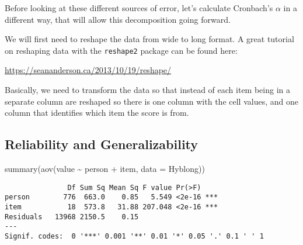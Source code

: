 \documentclass[
]{book}
\newenvironment{Shaded}{\begin{snugshade}}{\end{snugshade}}
\newcommand{\AttributeTok}[1]{\textcolor[rgb]{0.77,0.63,0.00}{#1}}
\newcommand{\CommentTok}[1]{\textcolor[rgb]{0.56,0.35,0.01}{\textit{#1}}}
\newcommand{\DecValTok}[1]{\textcolor[rgb]{0.00,0.00,0.81}{#1}}
\newcommand{\FunctionTok}[1]{\textcolor[rgb]{0.00,0.00,0.00}{#1}}
\newcommand{\NormalTok}[1]{#1}
\newcommand{\OtherTok}[1]{\textcolor[rgb]{0.56,0.35,0.01}{#1}}
\newcommand{\SpecialCharTok}[1]{\textcolor[rgb]{0.00,0.00,0.00}{#1}}
\newcommand{\StringTok}[1]{\textcolor[rgb]{0.31,0.60,0.02}{#1}}
\begin{document}
Before looking at these different sources of error, let's calculate Cronbach's \(\alpha\) in a different way, that will allow this decomposition going forward.

We will first need to reshape the data from wide to long format.
A great tutorial on reshaping data with the \texttt{reshape2} package can be found here:

\url{https://seananderson.ca/2013/10/19/reshape/}

Basically, we need to transform the data so that instead of each item being in a separate column are reshaped so there is one column with the cell values, and one column that identifies which item the score is from.

\begin{Shaded}
\end{Shaded}

\hypertarget{reliability-and-generalizability}{%
\subsection{Reliability and Generalizability}\label{reliability-and-generalizability}}

\begin{Shaded}
\begin{Highlighting}[]
\FunctionTok{summary}\NormalTok{(}\FunctionTok{aov}\NormalTok{(value }\SpecialCharTok{\textasciitilde{}}\NormalTok{ person }\SpecialCharTok{+}\NormalTok{ item, }\AttributeTok{data =}\NormalTok{ Hyblong))}
\end{Highlighting}
\end{Shaded}

\begin{verbatim}
               Df Sum Sq Mean Sq F value Pr(>F)    
person        776  663.0    0.85   5.549 <2e-16 ***
item           18  573.8   31.88 207.048 <2e-16 ***
Residuals   13968 2150.5    0.15                   
---
Signif. codes:  0 '***' 0.001 '**' 0.01 '*' 0.05 '.' 0.1 ' ' 1
\end{verbatim}
\end{document}
